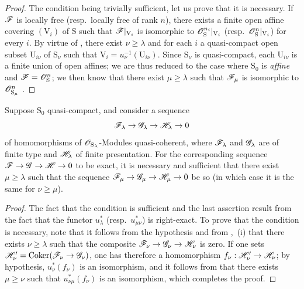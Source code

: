 \begin{proof}
The condition being trivially sufficient, let us prove that it is necessary.
If $\mathscr{F}$ is locally free (resp.\ locally free of rank $n$), there exists a finite open affine covering $(\mathrm{V}_i)$ of $\mathrm{S}$ such that $\mathscr{F}|_{\mathrm{V}_i}$ is isomorphic to $\mathscr{O}_\mathrm{S}^{n_i}|_{\mathrm{V}_i}$ (resp.\ $\mathscr{O}_\mathrm{S}^n|_{\mathrm{V}_i}$) for every $i$.
By virtue of , there exist $\nu\geqslant\lambda$ and for each $i$ a quasi-compact open subset $\mathrm{U}_{i\nu}$ of $\mathrm{S}_\nu$ such that $\mathrm{V}_i=u_\nu^{-1}(\mathrm{U}_{i\nu})$.
Since $\mathrm{S}_\nu$ is quasi-compact, each $\mathrm{U}_{i\nu}$ is a finite union of open affines; we are thus reduced to the case where $\mathrm{S}_0$ is \emph{affine} and $\mathscr{F}=\mathscr{O}_\mathrm{S}^n$; we then know that there exist $\mu\geqslant\lambda$ such that $\mathscr{F}_\mu$ is isomorphic to $\mathscr{O}_{\mathrm{S}_\mu}^n$ .
\end{proof}

\begin{proposition}[8.5.6]
\label{IV.8.5.6}
Suppose $\mathrm{S}_0$ quasi-compact, and consider a sequence
\[
  \mathscr{F}_\lambda\to\mathscr{G}_\lambda\to\mathscr{H}_\lambda\to 0
\]
of homomorphisms of $\mathscr{O}_{\mathrm{S}_\lambda}$-Modules quasi-coherent, where $\mathscr{F}_\lambda$ and $\mathscr{G}_\lambda$ are of finite type and $\mathscr{H}_\lambda$ of finite presentation.
For the corresponding sequence $\mathscr{F}\to\mathscr{G}\to\mathscr{H}\to 0$ to be exact, it is necessary and sufficient that there exist $\mu\geqslant\lambda$ such that the sequence $\mathscr{F}_\mu\to\mathscr{G}_\mu\to\mathscr{H}_\mu\to 0$ be so (in which case it is the same for $\nu\geqslant\mu$).
\end{proposition}

\begin{proof}
The fact that the condition is sufficient and the last assertion result from the fact that the functor $u_\lambda^*$ (resp.\ $u_{\mu\nu}^*$) is right-exact.
To prove that the condition is necessary, note that it follows from the hypothesis and from ,~(i) that there exists $\nu\geqslant\lambda$ such that the composite $\mathscr{F}_\nu\to\mathscr{G}_\nu\to\mathscr{H}_\nu$ is zero.
If one sets $\mathscr{H}'_\nu=\operatorname{Coker}(\mathscr{F}_\nu\to\mathscr{G}_\nu)$, one has therefore a homomorphism $f_\nu:\mathscr{H}'_\nu\to\mathscr{H}_\nu$; by hypothesis, $u_\nu^*(f_\nu)$ is an isomorphism, and it follows from  that there exists $\mu\geqslant\nu$ such that $u_{\nu\mu}^*(f_\nu)$ is an isomorphism, which completes the proof.
\end{proof}


